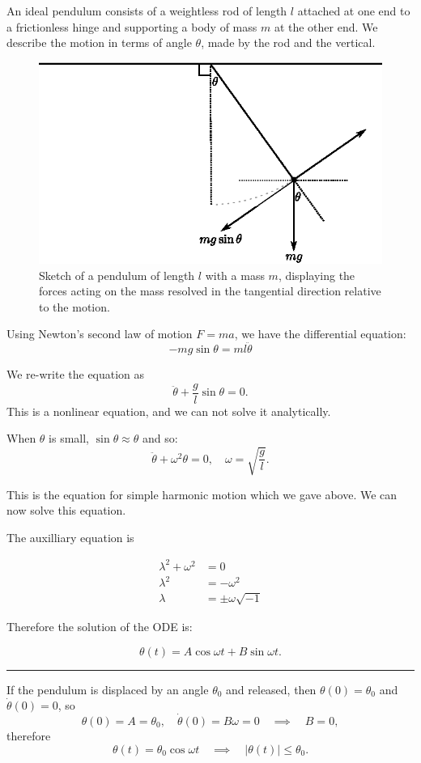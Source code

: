 \begin{example}[A pendulum]
An ideal pendulum consists of a weightless rod of length $l$ attached at one end to a frictionless hinge and supporting a body of mass $m$ at the other end. We describe the motion in terms of angle $\theta$, made by the rod and the vertical.

\begin{figure}[H]
\centering
\includegraphics[scale=1.0]{img/pendulum}
\caption{Sketch of a pendulum of length $l$ with a mass $m$, displaying the forces acting on the mass resolved in the tangential direction relative to the motion. }
\end{figure}

Using Newton's second law of motion $F=ma$, we have the differential equation:
\[-mg\sin\theta=ml\ddot{\theta}\]

We re-write the equation as 
\[\ddot{\theta}+\frac{g}{l}\sin\theta=0.\]
This is a nonlinear equation, and we can not solve it analytically. 

When $\theta$ is small, $\sin\theta\approx\theta$ and so:
\[\ddot{\theta}+\omega^2\theta=0,\quad \omega=\sqrt{\frac{g}{l}}.\]

This is the equation for simple harmonic motion which we gave above. We can now solve this equation.

The auxilliary equation is

\begin{align*}
\lambda^2+\omega^2&=0\\
\lambda^2&=-\omega^2\\
\lambda&=\pm\omega\sqrt{-1}
\end{align*}

Therefore the solution of the ODE is:

\[\theta(t)=A\cos\omega t + B\sin\omega t.\]

\hrule
\vspace{2mm}

If the pendulum is displaced by an angle $\theta_0$ and released, then $\theta(0)=\theta_0$ and $\dot{\theta}(0)=0$, so
\[\theta(0)=A=\theta_0, \quad \dot{\theta}(0)=B\omega=0 \quad \implies \quad B=0,\]
therefore 
\[\theta(t)=\theta_0\cos\omega t \quad\implies\quad |\theta(t)|\le \theta_0.\]
\end{example}

